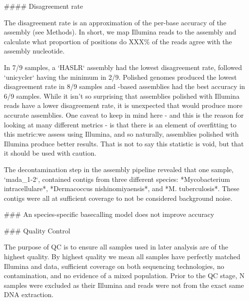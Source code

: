 \begin{markdown}

#### Disagreement rate

The disagreement rate is an approximation of the per-base accuracy of the assembly (see Methods). In short, we map Illumina reads to the assembly and calculate what proportion of positions do XXX\% of the reads agree with the assembly nucleotide.  

In 7/9 samples, a `HASLR` assembly had the lowest disagreement rate, followed `unicycler` having the minimum in 2/9. Polished genomes produced the lowest disagreement rate in 8/9 samples and \ont{}-based assemblies had the best accuracy in 6/9 samples. While it isn't so surprising that assemblies polished with Illumina reads have a lower disagreement rate, it is unexpected that \ont{} would produce more accurate assemblies. One caveat to keep in mind here - and this is the reason for looking at many different metrics - is that there is an element of overfitting to this metric:we assess using Illumina, and so naturally, assemblies polished with Illumina produce better results. That is not to say this statistic is void, but that it should be used with caution.



The decontamination step in the assembly pipeline revealed that one sample, `mada_1-2`, contained contigs from three different species: *Mycobacterium intracellulare*, *Dermacoccus nishinomiyaensis*, and *M. tuberculosis*. These contigs were all at sufficient coverage to not be considered background noise.


### An \mtb{} species-specific \ont{} basecalling model does not improve accuracy

### Quality Control

The purpose of QC is to ensure all samples used in later analysis are of the highest quality. By highest quality we mean all samples have perfectly matched Illumina and \ont{} data, sufficient coverage on both sequencing technologies, no contamination, and no evidence of a mixed \mtb{} population. Prior to the QC stage, N samples were excluded as their Illumina and \ont{} reads were not from the exact same DNA extraction.  


\end{markdown}
